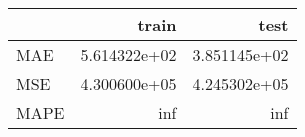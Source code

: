 \begin{tabular}{lrr}
\toprule
{} &         train &          test \\
\midrule
MAE  &  5.614322e+02 &  3.851145e+02 \\
MSE  &  4.300600e+05 &  4.245302e+05 \\
MAPE &           inf &           inf \\
\bottomrule
\end{tabular}
